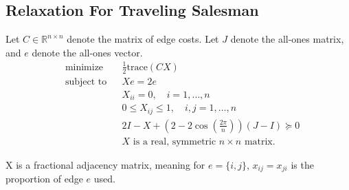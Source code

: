 \documentclass{article}
\begin{document}
\subsection{Relaxation For Traveling Salesman}
Let $C \in \mathbb{R}^{n \times n}$ denote the matrix of edge costs. Let $J$ denote the all-ones matrix, and $e$ denote the all-ones vector.
\begin{equation*}
\begin{aligned}
& {\text{minimize}}
& & \frac{1}{2}\text{trace}(CX) \\
& \text{subject to}
& & Xe = 2e \\
&&& X_{ii} = 0, \quad i = 1,\ldots,n\\
&&& 0 \leq X_{ij} \leq 1, \quad i,j = 1,\ldots,n \\
&&& 2I - X + (2-2\cos\left(\frac{2\pi}{n}\right))(J-I) \succeq 0 \\
&&& X \text{ is a real, symmetric } n \times n \text{ matrix}.
\end{aligned}
\end{equation*}

\noindent X is a fractional adjacency matrix, meaning for $e = \{i, j\}$, $x_{ij} = x_{ji}$ is the proportion of edge $e$ used.
\end{document}
